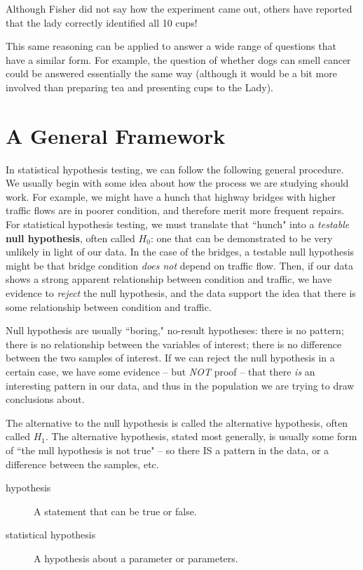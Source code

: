 \documentclass[twoside]{book}\usepackage[]{graphicx}\usepackage[]{xcolor}
\newcounter{example}[section]
\begin{document}
Although Fisher did not say how the experiment came out, others have reported
that the lady correctly identified all 10 cups!
\cite{salsburg}

This same reasoning can be applied to answer a wide range of questions that
have a similar form.  For example, the question of whether dogs can smell
cancer could be answered essentially the same way (although it would be a bit
more involved than preparing tea and presenting cups to the Lady).




\section{A General Framework}
In statistical hypothesis testing, we can follow the following general procedure.  We usually begin with some idea about how the process we are studying should work.  For example, we might have a hunch that highway bridges with higher traffic flows are in poorer condition, and therefore merit more frequent repairs.  For statistical hypothesis testing, we must translate that ``hunch" into a \emph{testable} \textbf{null hypothesis}, often called $H_0$:  one that can be demonstrated to be very unlikely in light of our data.  In the case of the bridges, a testable null hypothesis might be that bridge condition \emph{does not} depend on traffic flow.  Then, if our data shows a strong apparent relationship between condition and traffic, we have evidence to \emph{reject} the null hypothesis, and the data support the idea that there is some relationship between condition and traffic.

Null hypothesis are usually ``boring," no-result hypotheses:  there is no pattern; there is no relationship between the variables of interest; there is no difference between the two samples of interest.  If we can reject the null hypothesis in a certain case, we have some evidence -- but \emph{NOT} proof -- that there \emph{is} an interesting pattern in our data, and thus in the population we are trying to draw conclusions about. 

The alternative to the null hypothesis is called the alternative hypothesis, often called $H_1$.  The alternative hypothesis, stated most generally, is usually some form of ``the null hypothesis is not true" -- so there IS a pattern in the data, or a difference between the samples, etc.

\begin{description}
	\item[hypothesis] A statement that can be true or false.
	\item[statistical hypothesis] A hypothesis about a parameter or parameters.
\end{description}
\end{document}
